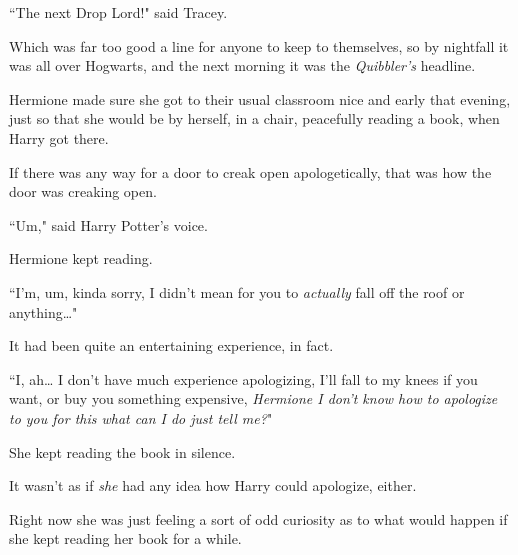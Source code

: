 ``The next Drop Lord!" said Tracey.

Which was far too good a line for anyone to keep to themselves, so by nightfall it was all over Hogwarts, and the next morning it was the \emph{Quibbler's} headline.


Hermione made sure she got to their usual classroom nice and early that evening, just so that she would be by herself, in a chair, peacefully reading a book, when Harry got there.

If there was any way for a door to creak open apologetically, that was how the door was creaking open.

``Um," said Harry Potter's voice.

Hermione kept reading.

``I'm, um, kinda sorry, I didn't mean for you to \emph{actually} fall off the roof or anything{\ldots}"

It had been quite an entertaining experience, in fact.

``I, ah{\ldots} I don't have much experience apologizing, I'll fall to my knees if you want, or buy you something expensive, \emph{Hermione I don't know how to apologize to you for this what can I do just tell me?}"

She kept reading the book in silence.

It wasn't as if \emph{she} had any idea how Harry could apologize, either.

Right now she was just feeling a sort of odd curiosity as to what would happen if she kept reading her book for a while.

